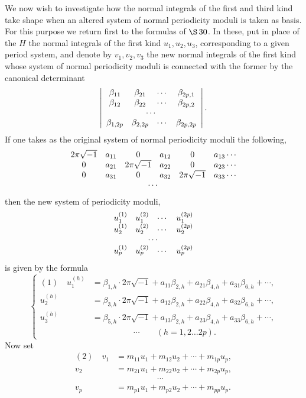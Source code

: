 \documentclass[10pt]{article}
\begin{document}
We now wish to investigate how the normal integrals of the first and third kind take shape when an altered system of normal periodicity moduli is taken as basis. For this purpose we return first to the formulas of \(\S\,30\). In these, put in place of the \(H\) the normal integrals of the first kind \(u_1,u_2,u_3\), corresponding to a given period system, and denote by \(v_1,v_2,v_3\) the new normal integrals of the first kind whose system of normal periodicity moduli is connected with the former by the canonical determinant
\[
\left|\begin{array}{cccc}
\beta_{11}&\beta_{21}&\cdots&\beta_{2p,1}\\
\beta_{12}&\beta_{22}&\cdots&\beta_{2p,2}\\
\multicolumn{4}{c}{\cdots}\\
\beta_{1,2p}&\beta_{2,2p}&\cdots&\beta_{2p,2p}
\end{array}\right|.
\]
If one takes as the original system of normal periodicity moduli the following,
\[
\begin{array}{cccccc}
2\pi\sqrt{-1}&a_{11}&0&a_{12}&0&a_{13}\cdots\\
0&a_{21}&2\pi\sqrt{-1}&a_{22}&0&a_{23}\cdots\\
0&a_{31}&0&a_{32}&2\pi\sqrt{-1}&a_{33}\cdots\\
\multicolumn{6}{c}{\cdots}
\end{array}
\]
then the new system of periodicity moduli,
\[
\begin{array}{cccc}
u_1^{(1)}&u_1^{(2)}&\cdots&u_1^{(2p)}\\
u_2^{(1)}&u_2^{(2)}&\cdots&u_2^{(2p)}\\
\multicolumn{4}{c}{\cdots}\\
u_p^{(1)}&u_p^{(2)}&\cdots&u_p^{(2p)}
\end{array}
\]
is given by the formula
\[
\left\{
\begin{aligned}
(1)\quad u_1^{(h)}&=\beta_{1,h}\cdot2\pi\sqrt{-1}+a_{11}\beta_{2,h}+a_{21}\beta_{4,h}+a_{31}\beta_{6,h}+\cdots,\\
u_2^{(h)}&=\beta_{3,h}\cdot2\pi\sqrt{-1}+a_{12}\beta_{2,h}+a_{22}\beta_{4,h}+a_{32}\beta_{6,h}+\cdots,\\
u_3^{(h)}&=\beta_{5,h}\cdot2\pi\sqrt{-1}+a_{13}\beta_{2,h}+a_{23}\beta_{4,h}+a_{33}\beta_{6,h}+\cdots,\\
&\hspace{5em}\cdots\qquad (h=1,2\ldots2p).
\end{aligned}
\right.
\]
Now set
\[
\begin{aligned}
(2)\quad
v_1&=m_{11}u_1+m_{12}u_2+\cdots+m_{1p}u_p,\\
v_2&=m_{21}u_1+m_{22}u_2+\cdots+m_{2p}u_p,\\
&\hspace{5em}\cdots\\
v_p&=m_{p1}u_1+m_{p2}u_2+\cdots+m_{pp}u_p.
\end{aligned}
\]
\end{document}
